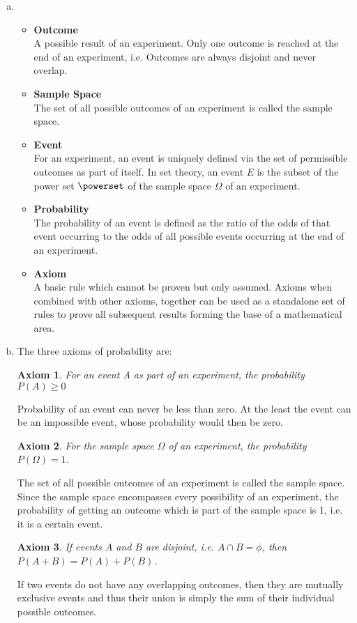 \begin{enumerate}[a.]
	\item 
		\begin{itemize}
			\item \textbf{Outcome}\\
			A possible result of an experiment. Only one outcome is reached at the end of an experiment, i.e. Outcomes are always disjoint and never overlap.
			\item \textbf{Sample Space}\\
			The set of all possible outcomes of an experiment is called the sample space.
			\item \textbf{Event}\\
			For an experiment, an event is uniquely defined via the set of permissible outcomes as part of itself. In set theory, an event $E$ is the subset of the power set $\powerset$ of the sample space $\Omega$ of an experiment.
			\item \textbf{Probability}\\
			The probability of an event is defined as the ratio of the odds of that event occurring to the odds of all possible events occurring at the end of an experiment.
			\item \textbf{Axiom}\\
			A basic rule which cannot be proven but only assumed. Axioms when combined with other axioms, together can be used as a standalone set of rules to prove all subsequent results forming the base of a mathematical area.	 
		\end{itemize}
	\item The three axioms of probability are:
	\newtheorem{axiom}{Axiom}
	\begin{axiom}
		For an event A as part of an experiment, the probability $P(A) \geq 0$
	\end{axiom}
	Probability of an event can never be less than zero. At the least the event can be an impossible event, whose probability would then be zero.
	\begin{axiom}
		For the sample space $\Omega$ of an experiment, the probability $P(\Omega) = 1$.
	\end{axiom}
	The set of all possible outcomes of an experiment is called the sample space. Since the sample space encompasses every possibility of an experiment, the probability of getting an outcome which is part of the sample space is 1, i.e. it is a certain event.
	\begin{axiom}
		If events $A$ and $B$ are disjoint, i.e. $A \cap B = \phi$, then $P(A+B) = P(A) + P(B)$.
	\end{axiom}
	If two events do not have any overlapping outcomes, then they are mutually exclusive events and thus their union is simply the sum of their individual possible outcomes.
	

\end{enumerate}
